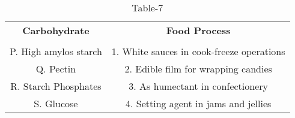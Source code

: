 \begin{table}[htbp]
  \centering
  \caption{Table-7}
  \label{tab:tables/table7.tex}
  \begin{tabular}{cc}
  \textbf{Carbohydrate} & \textbf{Food Process} \\ \\
    P. High amylos starch & 1. White sauces in cook-freeze operations \\
    Q. Pectin & 2. Edible  film for wrapping candies \\
    R. Starch Phosphates & 3. As humectant in confectionery \\
    S. Glucose & 4. Setting agent in jams and jellies \\
  \end{tabular}
\end{table}
